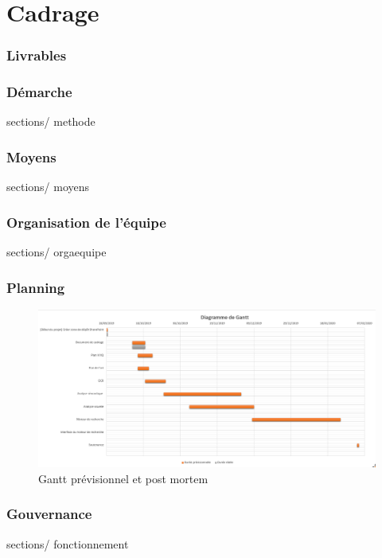 \documentclass[french, 11pt, a4paper]{article}
\begin{document}
\newpage
\part {Cadrage}

\section {Livrables}

\section {Démarche}
 {sections/} {methode}

\section {Moyens}
 {sections/} {moyens}

\section {Organisation de l'équipe}
 {sections/} {orgaequipe}

\section {Planning}
\begin{figure}[h!]
	\includegraphics[width=\linewidth]{images/gantt.png}
	\caption{Gantt prévisionnel et post mortem}
	\label{fig:MC}
\end{figure}		

\section {Gouvernance}
 {sections/} {fonctionnement}

\newpage
\end{document}
